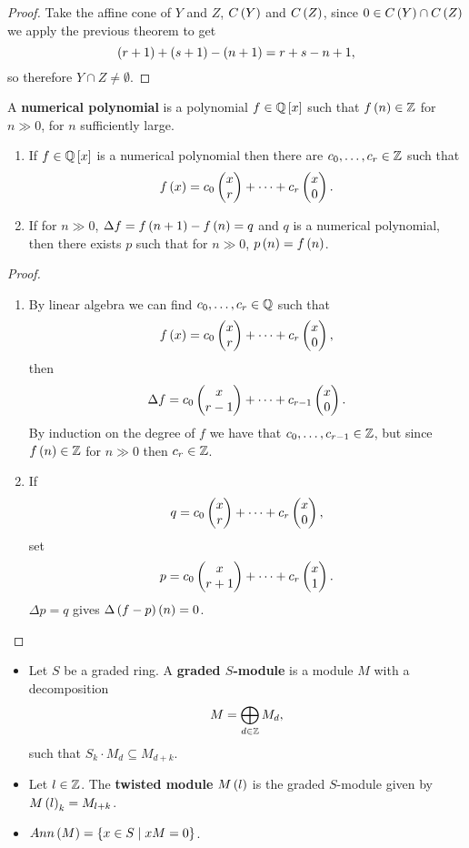 \begin{proof}
Take the affine cone of $ Y $ and $ Z $, $ C\left( Y \right) $ and $ C\left( Z \right) $, since $ 0 \in C\left( Y \right) \cap C\left( Z \right) $ we apply the previous theorem to get
$$ \left( r + 1 \right) + \left( s + 1 \right) - \left( n + 1 \right) = r + s - n + 1, $$
so therefore $ Y \cap Z \ne \emptyset $.
\end{proof}

\begin{definition}
A \textbf{numerical polynomial} is a polynomial $ f \in \mathbb{Q}\left[ x \right] $ such that $ f\left( n \right) \in \mathbb{Z} $ for $ n \gg 0 $, for $ n $ sufficiently large.
\end{definition}

\begin{theorem}
\hfill
\begin{enumerate}
\item If $ f \in \mathbb{Q}\left[ x \right] $ is a numerical polynomial then there are $ c_0, \dots, c_r \in \mathbb{Z} $ such that
$$ f\left( x \right) = c_0\begin{pmatrix} x \\ r \end{pmatrix} + \dots + c_r\begin{pmatrix} x \\ 0 \end{pmatrix}. $$
\item If for $ n \gg 0 $, $ \Delta f = f\left( n + 1 \right) - f\left( n \right) = q $ and $ q $ is a numerical polynomial, then there exists $ p $ such that for $ n \gg 0 $, $ p\left( n \right) = f\left( n \right) $.
\end{enumerate}
\end{theorem}

\begin{proof}
\hfill
\begin{enumerate}
\item By linear algebra we can find $ c_0, \dots, c_r \in \mathbb{Q} $ such that
$$ f\left( x \right) = c_0\begin{pmatrix} x \\ r \end{pmatrix} + \dots + c_r\begin{pmatrix} x \\ 0 \end{pmatrix}, $$
then
$$ \Delta f = c_0\begin{pmatrix} x \\ r - 1 \end{pmatrix} + \dots + c_{r - 1}\begin{pmatrix} x \\ 0 \end{pmatrix}. $$
By induction on the degree of $ f $ we have that $ c_0, \dots, c_{r - 1} \in \mathbb{Z} $, but since $ f\left( n \right) \in \mathbb{Z} $ for $ n \gg 0 $ then $ c_r \in \mathbb{Z} $.
\item If
$$ q = c_0\begin{pmatrix} x \\ r \end{pmatrix} + \dots + c_r\begin{pmatrix} x \\ 0 \end{pmatrix}, $$
set
$$ p = c_0\begin{pmatrix} x \\ r + 1 \end{pmatrix} + \dots + c_r\begin{pmatrix} x \\ 1 \end{pmatrix}. $$
$ \Delta p = q $ gives $ \Delta \left( f - p \right)\left( n \right) = 0 $.
\end{enumerate}
\end{proof}

\pagebreak

\begin{definition}
\hfill
\begin{itemize}
\item Let $ S $ be a graded ring. A \textbf{graded $ S $-module} is a module $ M $ with a decomposition
$$ M = \bigoplus_{d \in \mathbb{Z}} M_d, $$
such that $ S_k \cdot M_d \subseteq M_{d + k} $.
\item Let $ l \in \mathbb{Z} $. The \textbf{twisted module} $ M\left( l \right) $ is the graded $ S $-module given by $ M\left( l \right)_k = M_{l + k} $.
\item $ Ann\left( M \right) = \left\{ x \in S \mid xM = 0 \right\} $.
\end{itemize}
\end{definition}

